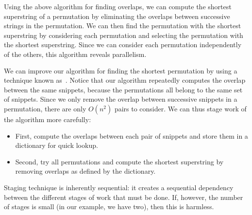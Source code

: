 %
%
%
\begin{algorithm}
Using the above algorithm for finding overlaps, we can compute the
shortest superstring of a permutation by eliminating the overlaps
between successive strings in the permutation.
%
We can then find the permutation with the shortest superstring by
considering each permutation and selecting the permutation with the
shortest superstring.
%
Since we can consider each permutation independently of the others,
this algorithm reveals parallelism.

\end{algorithm}

\begin{algorithm}
We can improve our algorithm for finding the shortest permutation by
using a technique known as~.
%
Notice that our algorithm repeatedly computes the overlap between the
same snippets, because the permutations all belong to the same set of
snippets.
%
Since we only remove the overlap between successive snippets in a
permutation, there are only $O(n^2)$ pairs to consider.
%
We can thus stage work of the algorithm more carefully:

\begin{itemize}
\item First,  compute the overlaps between each pair of snippets and
  store them in a dictionary for quick lookup.
\item Second, try all permutations and compute the shortest
  superstring by removing overlaps as defined by the dictionary.
\end{itemize}
%
\end{algorithm}

\begin{note}
Staging technique is inherently sequential: it creates a sequential
dependency between the different stages of work that must be done.  
%
If, however, the number of stages is small (in our example, we have
two), then this is harmless. 
\end{note}

